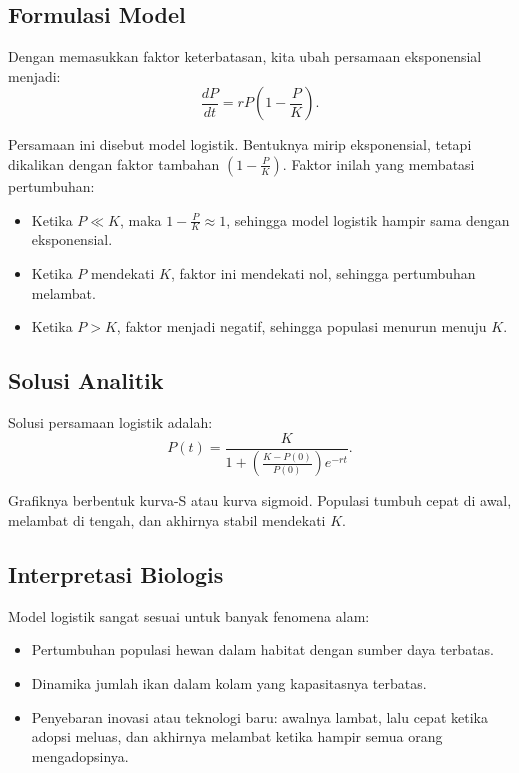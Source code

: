 \documentclass{bukumjh}
\begin{document}
\subsection*{Formulasi Model}

Dengan memasukkan faktor keterbatasan, kita ubah persamaan eksponensial menjadi:
\[
\frac{dP}{dt} = rP\left(1 - \frac{P}{K}\right).
\]

Persamaan ini disebut {\jsg model logistik}. Bentuknya mirip eksponensial, tetapi dikalikan dengan faktor tambahan $\left(1 - \frac{P}{K}\right)$. Faktor inilah yang membatasi pertumbuhan:

\begin{itemize}
    \item Ketika $P \ll K$, maka $1 - \frac{P}{K} \approx 1$, sehingga model logistik hampir sama dengan eksponensial.
    \item Ketika $P$ mendekati $K$, faktor ini mendekati nol, sehingga pertumbuhan melambat.
    \item Ketika $P > K$, faktor menjadi negatif, sehingga populasi menurun menuju $K$.
\end{itemize}


\subsection*{Solusi Analitik}

Solusi persamaan logistik adalah:
\[
P(t) = \frac{K}{1 + \left(\frac{K - P(0)}{P(0)}\right)e^{-rt}}.
\]

Grafiknya berbentuk kurva-S atau {\jsg kurva sigmoid}. Populasi tumbuh cepat di awal, melambat di tengah, dan akhirnya stabil mendekati $K$.

\begin{center}
\end{center}

\subsection*{Interpretasi Biologis}

Model logistik sangat sesuai untuk banyak fenomena alam:
\begin{itemize}
    \item Pertumbuhan populasi hewan dalam habitat dengan sumber daya terbatas.
    \item Dinamika jumlah ikan dalam kolam yang kapasitasnya terbatas.
    \item Penyebaran inovasi atau teknologi baru: awalnya lambat, lalu cepat ketika adopsi meluas, dan akhirnya melambat ketika hampir semua orang mengadopsinya.
\end{itemize}
\end{document}
